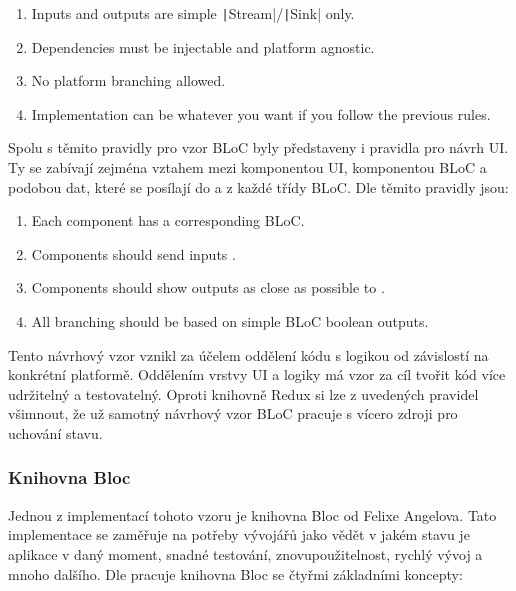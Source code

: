 \begin{enumerate}
    \item Inputs and outputs are simple
    \texttt|Stream|/\texttt|Sink| only.
    \item Dependencies must be injectable and platform agnostic.
    \item No platform branching allowed.
    \item Implementation can be whatever you want
    if you follow the previous rules.
\end{enumerate}

Spolu s těmito pravidly pro vzor BLoC byly představeny
\cite{googledevelopers_bloc} i pravidla pro návrh UI.
Ty se zabívají zejména vztahem mezi komponentou UI, komponentou BLoC
a podobou dat,
které se posílají do a z každé třídy BLoC.
Dle \cite{googledevelopers_bloc} těmito pravidly jsou:

\begin{enumerate}
    \item Each  component has a corresponding BLoC.
    \item Components should send inputs .
    \item Components should show outputs as close as possible to .
    \item All branching should be based on simple BLoC boolean outputs.
\end{enumerate}

Tento návrhový vzor vznikl za účelem oddělení kódu s logikou
od závislostí na konkrétní platformě.
Oddělením vrstvy UI a logiky má vzor za cíl tvořit kód více udržitelný a
testovatelný. \cite{flutterando_analyzing_bloc_mobx}
Oproti knihovně Redux si lze z uvedených pravidel všimnout,
že už samotný návrhový vzor BLoC pracuje s vícero zdroji pro uchování stavu.

\subsubsection{Knihovna Bloc}

Jednou z implementací tohoto vzoru je knihovna Bloc od Felixe Angelova.
\cite{bloclibrary_whybloc}
Tato implementace se zaměřuje na potřeby vývojářů jako
vědět v jakém stavu je aplikace v daný moment, snadné testování,
znovupoužitelnost, rychlý vývoj a mnoho dalšího. 
Dle \cite{bloclibrary_coreconcepts} pracuje knihovna Bloc se čtyřmi základními
koncepty: 

